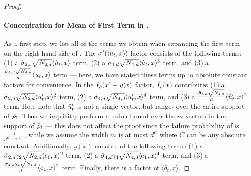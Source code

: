 \begin{proof}
\paragraph{Concentration for Mean of First Term in .} As a first step, we list all of the terms we obtain when expanding the first term on the right-hand side of . The $\sigma'(\langle \hat{u}_t, x \rangle)$ factor consists of the following terms: (1) a $\hat{\sigma}_{2, d} \sqrt{N_{2, d}} \langle \hat{u}_t, x \rangle$ term, (2) a $\hat{\sigma}_{4, d} \sqrt{N_{4, d}} \langle \hat{u}_t, x \rangle^3$ term, and (3) a $\frac{\hat{\sigma}_{4, d} \sqrt{N_{4, d}}}{d} \langle \hat{u}_t, x \rangle$ term --- here, we have stated these terms up to absolute constant factors for convenience. In the $f_{{\hat{\rho}}}(x) - y(x)$ factor, $f_{{\hat{\rho}}}(x)$ contributes (1) a $\hat{\sigma}_{2, d} \sqrt{N_{2, d}} \langle \hat{u}_t', x \rangle^2$ term, (2) a $\hat{\sigma}_{4, d} \sqrt{N_{4, d}} \langle \hat{u}_t', x \rangle^4$ term, and (3) a $\frac{\hat{\sigma}_{4, d} \sqrt{N_{4, d}}}{d} \langle \hat{u}_t', x \rangle^2$ term. Here note that $\hat{u}_t'$ is not a single vector, but ranges over the entire support of ${\hat{\rho}}_t$. Thus we implicitly perform a union bound over the $m$ vectors in the support of ${\hat{\rho}}_t$ --- this does not affect the proof since the failure probability of  is $\frac{1}{d^{\Omega(\log d)}}$, while we assume the width $m$ is at most $d^C$ where $C$ can be any absolute constant. Additionally, $y(x)$ consists of the following terms: (1) a $\hat{\sigma}_{2, d} \gamma_2 \sqrt{N_{2, d}} \langle e_1, x \rangle^2$ term, (2) a $\hat{\sigma}_{4, d} \gamma_4 \sqrt{N_{4, d}} \langle e_1, x \rangle^4$ term, and (3) a $\frac{\hat{\sigma}_{4, d} \gamma_4 \sqrt{N_{4, d}}}{d} \langle e_1, x \rangle^2$ term. Finally, there is a factor of $\langle \delta_t, x \rangle$.


\end{proof}
